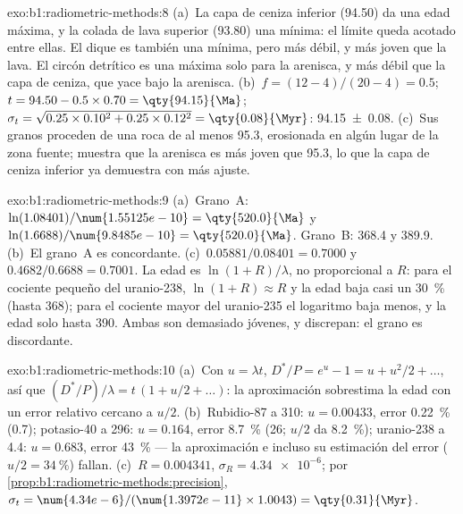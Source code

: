 \begin{solution}{exo:b1:radiometric-methods:8}
(a)~La capa de ceniza inferior (\qty{94.50}{\Ma}) da una edad máxima, y la colada de lava superior
(\qty{93.80}{\Ma}) una mínima: el límite queda acotado entre ellas. El dique es también una mínima, pero más débil, y más joven que la lava. El circón detrítico es una máxima solo para la arenisca, y más débil que la capa de ceniza, que yace bajo la arenisca.
(b)~$f = (12 - 4)/(20 - 4) = 0.5$; $t = 94.50 - 0.5 \times 0.70 =
\qty{94.15}{\Ma}$; $\sigma_t = \sqrt{0.25 \times 0.10^2 + 0.25 \times 0.12^2} =
\qty{0.08}{\Myr}$: \qty[uncertainty-mode=separate]{94.15(8)}{\Ma}. (c)~Sus
granos proceden de una roca de al menos \qty{95.3}{\Ma}, erosionada en algún lugar de la zona fuente; muestra que la arenisca es más joven que \qty{95.3}{\Ma}, lo que la capa de ceniza inferior ya demuestra con más ajuste.
\end{solution}

\begin{solution}{exo:b1:radiometric-methods:9}
(a)~Grano~A: $\ln(1.08401)/\num{1.55125e-10} = \qty{520.0}{\Ma}$ y
$\ln(1.6688)/\num{9.8485e-10} = \qty{520.0}{\Ma}$. Grano~B: \qty{368.4}{\Ma} y
\qty{389.9}{\Ma}. (b)~El grano~A es concordante. (c)~$0.05881/0.08401 = 0.7000$ y
$0.4682/0.6688 = 0.7001$. La edad es $\ln(1 + R)/\lambda$, no proporcional a
$R$: para el cociente pequeño del uranio-238, $\ln(1+R) \approx R$ y la edad baja casi un \qty{30}{\percent} (hasta \qty{368}{\Ma}); para el cociente mayor del uranio-235 el logaritmo baja menos, y la edad solo hasta \qty{390}{\Ma}. Ambas son demasiado jóvenes, y discrepan: el grano es discordante.
\end{solution}

\begin{solution}{exo:b1:radiometric-methods:10}
(a)~Con $u = \lambda t$, $D^*/P = e^u - 1 = u + u^2/2 + \dots$, así que $(D^*/P)/\lambda
= t\,(1 + u/2 + \dots)$: la aproximación sobrestima la edad con un error relativo cercano a $u/2$. (b)~Rubidio-87 a \qty{310}{\Ma}: $u = 0.00433$, error
\qty{0.22}{\percent} (\qty{0.7}{\Myr}); potasio-40 a \qty{296}{\Ma}: $u =
0.164$, error \qty{8.7}{\percent} (\qty{26}{\Myr}; $u/2$ da \qty{8.2}{\percent});
uranio-238 a \qty{4.4}{\Ga}: $u = 0.683$, error \qty{43}{\percent} --- la
aproximación e incluso su estimación del error ($u/2 = \qty{34}{\percent}$) fallan.
(c)~$R = 0.004341$, $\sigma_R = \num{4.34e-6}$; por
\cref{prop:b1:radiometric-methods:precision}, $\sigma_t =
\num{4.34e-6}/(\num{1.3972e-11} \times 1.0043) = \qty{0.31}{\Myr}$.
\end{solution}

